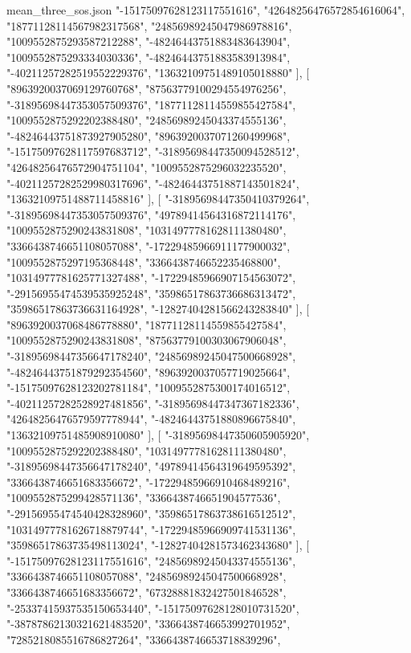 \begin{filecontents*}[overwrite]{mean_three_sos.json}
    "-15175097628123117551616",
    "42648256476572854616064",
    "18771128114567982317568",
    "24856989245047986978816",
    "1009552875293587212288",
    "-48246443751883483643904",
    "1009552875293334030336",
    "-48246443751883583913984",
    "-40211257282519552229376",
    "13632109751489105018880"
   ],
   [
    "8963920037069129760768",
    "87563779100294554976256",
    "-31895698447353057509376",
    "18771128114559855427584",
    "1009552875292202388480",
    "24856989245043374555136",
    "-48246443751873927905280",
    "8963920037071260499968",
    "-15175097628117597683712",
    "-31895698447350094528512",
    "42648256476572904751104",
    "1009552875296032235520",
    "-40211257282529980317696",
    "-48246443751887143501824",
    "13632109751488711458816"
   ],
   [
    "-31895698447350410379264",
    "-31895698447353057509376",
    "49789414564316872114176",
    "1009552875290243831808",
    "10314977781628111380480",
    "3366438746651108057088",
    "-17229485966911177900032",
    "1009552875297195368448",
    "3366438746652235468800",
    "10314977781625771327488",
    "-17229485966907154563072",
    "-29156955474539535925248",
    "35986517863736686313472",
    "35986517863736631164928",
    "-12827404281566243283840"
   ],
   [
    "8963920037068486778880",
    "18771128114559855427584",
    "1009552875290243831808",
    "87563779100303067906048",
    "-31895698447356647178240",
    "24856989245047500668928",
    "-48246443751879292354560",
    "8963920037057719025664",
    "-15175097628123202781184",
    "1009552875300174016512",
    "-40211257282528927481856",
    "-31895698447347367182336",
    "42648256476579597778944",
    "-48246443751880896675840",
    "13632109751485908910080"
   ],
   [
    "-31895698447350605905920",
    "1009552875292202388480",
    "10314977781628111380480",
    "-31895698447356647178240",
    "49789414564319649595392",
    "3366438746651683356672",
    "-17229485966910468489216",
    "1009552875299428571136",
    "3366438746651904577536",
    "-29156955474540428328960",
    "35986517863738616512512",
    "10314977781626718879744",
    "-17229485966909741531136",
    "35986517863735498113024",
    "-12827404281573462343680"
   ],
   [
    "-15175097628123117551616",
    "24856989245043374555136",
    "3366438746651108057088",
    "24856989245047500668928",
    "3366438746651683356672",
    "67328881832427501846528",
    "-25337415937535150653440",
    "-15175097628128010731520",
    "-38787862130321621483520",
    "3366438746653992701952",
    "7285218085516786827264",
    "3366438746653718839296",

\end{filecontents*}
